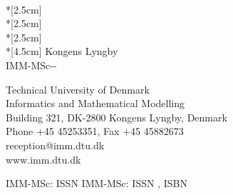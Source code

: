 \thispagestyle{empty}
\vspace*{\fill}
\begin{center}
\hspace{-6.64mm}{\huge\sffamily\bfseries Personalising the Editorial Mix}\\*[2.5cm]
\vspace{-24.5mm}\hspace{-6.64mm}{\huge\sffamily\bfseries for a Digital Newspaper}\\*[2.5cm]
\vspace{-24.5mm}\hspace{-6.64mm}{\huge\sffamily\bfseries using Constraint Programming}\\*[2.5cm]
\vspace{24.5mm}\hspace{-6.64mm}\Large\sf\thesisauthor\\*[4.5cm]
\hspace{-6.64mm}\small\sf Kongens Lyngby \thesisyear\\
\small\sf\hspace{-6.64mm} IMM-MSc-\thesisyear-\thesisnumber


\end{center}
\vspace*{\fill}
\newpage
\thispagestyle{empty}
\vspace*{11cm}
{\sf Technical University of Denmark}\\
{\sf Informatics and Mathematical Modelling}\\
{\sf Building 321, DK-2800 Kongens Lyngby, Denmark}\\
{\sf Phone +45 45253351, Fax +45 45882673}\\
{\sf reception@imm.dtu.dk}\\
{\sf www.imm.dtu.dk}

\vspace*{2.5cm}
\def\empty{}
\ifx\thesisISBN\empty
 {\sf IMM-MSc: ISSN \thesisISSN}
\else
  {\sf IMM-MSc: ISSN \thesisISSN, ISBN \thesisISBN}
\fi